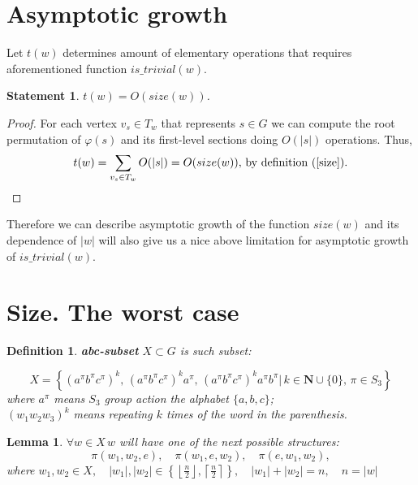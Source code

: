 \documentclass[a4paper,12pt]{amsart}
\newtheorem{definition}{Definition}
\newtheorem{statement}{Statement}
\newtheorem{lemma}[theorem]{Lemma}
\begin{document}
\section{Asymptotic growth}

Let $t(w)$ determines amount of elementary operations that requires aforementioned function $is\_trivial(w)$.


\begin{statement}
	$t(w) = O(size(w))$.
\end{statement}

\begin{proof}
	For each vertex $v_s \in T_w$ that represents $s \in G$ we can compute the root permutation of $\varphi(s)$ and its
	first-level sections doing $O(|s|)$ operations. Thus,
	$$
	t(w) = \sum_{v_s \in T_w} O(|s|) = O(size(w)),\, \text{by definition (\ref{size})}.
	$$
	
\end{proof}

Therefore we can describe asymptotic growth of the function $size(w)$ and its dependence of $|w|$ will 
also give us a nice above limitation for asymptotic growth of $is\_trivial(w)$.

\section{Size. The worst case}


\begin{definition}
	\textbf{abc-subset} $X \subset  G$ is such subset: 
	
	\begin{equation}
	X = \left\{ (a^\pi b^\pi c^\pi)^k, \, (a^\pi b^\pi c^\pi)^k a^\pi, \, (a^\pi b^\pi c^\pi)^k a^\pi b^\pi  |\, k \in \mathbf{N}\cup\{0\}, \, \pi \in S_3   \right\}
	\end{equation}
	where $a^\pi$ means $S_3$ group action the alphabet $\{a, b, c\}$; \\
	$(w_1 w_2 w_3)^k$ means repeating $k$ times of the word in the parenthesis.
	\\
	
\end{definition}

\begin{lemma}
	$\forall w \in X \, w$ will have one of the next possible structures:
	$$\pi (w_1, w_2, e), \quad \pi(w_1, e, w_2), \quad \pi(e, w_1, w_2), $$
	where $w_1, w_2 \in X, \quad |w_1|, |w_2| \in
	\left\{
		\left\lfloor
			\frac{n}{2}
		\right\rfloor,
		\left\lceil
			\frac{n}{2}
		\right\rceil
	\right\}, \quad |w_1| + |w_2| = n, \quad n = |w|$
	\\
\end{lemma}
\end{document}
